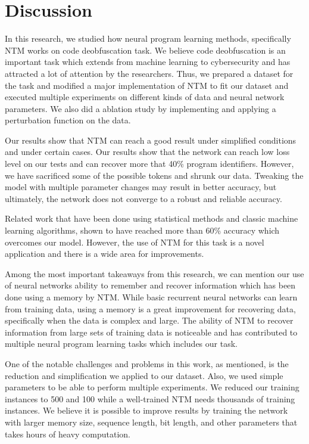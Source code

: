 \documentclass[acmsmall]{acmart}
\begin{document}
\section{Discussion}
In this research, we studied how neural program learning methods, specifically NTM works on code deobfuscation task. We believe code deobfuscation is an important task which extends from machine learning to cybersecurity and has attracted a lot of attention by the researchers. Thus, we prepared a dataset for the task and modified a major implementation of NTM to fit our dataset and executed multiple experiments on different kinds of data and neural network parameters. We also did a ablation study by implementing and applying a perturbation function on the data.

Our results show that NTM can reach a good result under simplified conditions and under certain cases. Our results show that the network can reach low loss level on our tests and can recover more that 40\% program identifiers. However, we have sacrificed some of the possible tokens and shrunk our data. Tweaking the model with multiple parameter changes may result in better accuracy, but ultimately, the network does not converge to a robust and reliable accuracy.

Related work that have been done using statistical methods and classic machine learning algorithms, shown to have reached more than 60\% accuracy which overcomes our model. However, the use of NTM for this task is a novel application and there is a wide area for improvements.

Among the most important takeaways from this research, we can mention our use of neural networks ability to remember and recover information which has been done using a memory by NTM. While basic recurrent neural networks can learn from training data, using a memory is a great improvement for recovering data, specifically when the data is complex and large. The ability of NTM to recover information from large sets of training data is noticeable and has contributed to multiple neural program learning tasks which includes our task.

One of the notable challenges and problems in this work, as mentioned, is the reduction and simplification we applied to our dataset. Also, we used simple parameters to be able to perform multiple experiments. We reduced our training instances to 500 and 100 while a well-trained NTM needs thousands of training instances. We believe it is possible to improve results by training the network with larger memory size, sequence length, bit length, and other parameters that takes hours of heavy computation.
\end{document}
